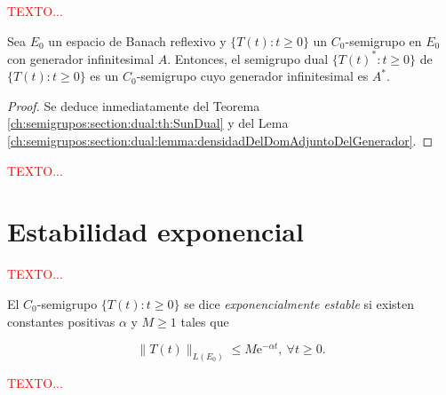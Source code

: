 \textcolor{red}{TEXTO...}\\

\begin{Corolario}
    \label{ch:semigrupos:section:dual:cor:dualReflex}

    Sea $E_0$ un espacio de Banach reflexivo y $\{T(t) : t \geq 0\}$ un $C_0$-semigrupo en $E_0$ con generador infinitesimal $A$. Entonces, el semigrupo dual $\{T(t)^* : t \geq 0\}$ de $\{T(t) : t \geq 0\}$ es un $C_0$-semigrupo cuyo generador infinitesimal es $A^*$.
\end{Corolario}

\begin{proof}
    Se deduce inmediatamente del Teorema \ref{ch:semigrupos:section:dual:th:SunDual} y del Lema \ref{ch:semigrupos:section:dual:lemma:densidadDelDomAdjuntoDelGenerador}.
\end{proof}

\textcolor{red}{TEXTO...}\\

\section{Estabilidad exponencial}
\label{ch:semigrupos:section:estExp}

\textcolor{red}{TEXTO...}\\

\begin{Definicion}
    \label{ch:semigrupos:section:estExp:def:estExp}

    El $C_0$-semigrupo $\{T(t) : t \geq 0\}$ se dice \textit{exponencialmente estable} si existen constantes positivas $\alpha$ y $M \ge 1$ tales que

    \[\lVert T(t) \rVert_{L(E_0)} \leq M \mathrm{e}^{-\alpha t}, \ \forall t \geq 0.\]
\end{Definicion}

\textcolor{red}{TEXTO...}\\

